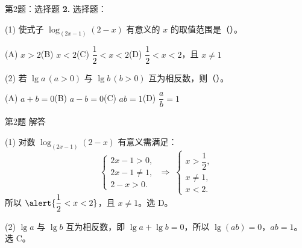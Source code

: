 \documentclass[10pt,aspectratio=169,serif]{beamer}
\begin{document}
\begin{frame}[t]{第2题：选择题}
\textbf{2.} 选择题：

\vspace{0.5em}
(1) 使式子 $\log_{(2x-1)}(2-x)$ 有意义的 $x$ 的取值范围是（\quad）。

\vspace{0.3em}
\hspace{2em}(A) $x>2$\hspace{2em}(B) $x<2$\hspace{2em}(C) $\dfrac{1}{2}<x<2$\hspace{2em}(D) $\dfrac{1}{2}<x<2$，且 $x\neq 1$

\vspace{0.8em}
(2) 若 $\lg a\,(a>0)$ 与 $\lg b\,(b>0)$ 互为相反数，则（\quad）。

\vspace{0.3em}
\hspace{2em}(A) $a+b=0$\hspace{2em}(B) $a-b=0$\hspace{2em}(C) $ab=1$\hspace{2em}(D) $\dfrac{a}{b}=1$
\end{frame}

\begin{frame}[t]{第2题 解答}
\begin{tcolorbox}[colback=orange!10,colframe=orange,title=\textbf{解}]
(1) 对数 $\log_{(2x-1)}(2-x)$ 有意义需满足：
\[
\begin{cases}
2x-1 > 0,\\
2x-1 \neq 1,\\
2-x > 0.
\end{cases}
\;\Longrightarrow\;
\begin{cases}
x > \dfrac{1}{2},\\
x \neq 1,\\
x < 2.
\end{cases}
\]
所以 $\alert{\dfrac{1}{2}<x<2}$，且 $x\neq 1$。选 \alert{D}。

(2) $\lg a$ 与 $\lg b$ 互为相反数，即 $\lg a + \lg b = 0$，所以 $\lg(ab) = 0$，$ab = 1$。选 \alert{C}。
\end{tcolorbox}
\end{frame}
\end{document}
